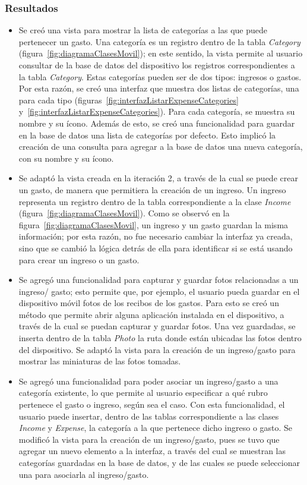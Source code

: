 \subsubsection{Resultados}
\begin{itemize}
\item Se creó una vista para mostrar la lista de categorías a las que puede pertenecer un gasto. Una categoría es un registro dentro de la tabla \textit{Category} (figura~\ref{fig:diagramaClasesMovil}); en este sentido, la vista permite al usuario consultar de la base de datos del dispositivo los registros correspondientes a la tabla \textit{Category}. Estas categorías pueden ser de dos tipos: ingresos o gastos. Por esta razón, se creó una interfaz que muestra dos listas de categorías, una para cada tipo (figuras~\ref{fig:interfazListarExpenseCategories} y~\ref{fig:interfazListarExpenseCategories}). Para cada categoría, se muestra su nombre y su ícono. Además de esto, se creó una funcionalidad para guardar en la base de datos una lista de categorías por defecto. Esto implicó la creación de una consulta para agregar a la base de datos una nueva categoría, con su nombre y su ícono.
\item Se adaptó la vista creada en la iteración 2, a través de la cual se puede crear un gasto, de manera que permitiera la creación de un ingreso. Un ingreso representa un registro dentro de la tabla correspondiente a la clase \textit{Income} (figura~\ref{fig:diagramaClasesMovil}). Como se observó en la figura~\ref{fig:diagramaClasesMovil}, un ingreso y un gasto guardan la misma información; por esta razón, no fue necesario cambiar la interfaz ya creada, sino que se cambió la lógica detrás de ella para identificar si se está usando para crear un ingreso o un gasto.
\item Se agregó una funcionalidad para capturar y guardar fotos relacionadas a un ingreso/ gasto; esto permite que, por ejemplo, el usuario pueda guardar en el dispositivo móvil fotos de los recibos de los gastos. Para esto se creó un método que permite abrir alguna aplicación instalada en el dispositivo, a través de la cual se puedan capturar y guardar fotos. Una vez guardadas, se inserta dentro de la tabla \textit{Photo} la ruta donde están ubicadas las fotos dentro del dispositivo. Se adaptó la vista para la creación de un ingreso/gasto para mostrar las miniaturas de las fotos tomadas.%
\item Se agregó una funcionalidad para poder asociar un ingreso/gasto a una categoría existente, lo que permite al usuario especificar a qué rubro pertenece el gasto o ingreso, según sea el caso. Con esta funcionalidad, el usuario puede insertar, dentro de las tablas correspondiente a las clases \textit{Income} y \textit{Expense}, la categoría a la que pertenece dicho ingreso o gasto. Se modificó la vista para la creación de un ingreso/gasto, pues se tuvo que agregar un nuevo elemento a la interfaz, a través del cual se muestran las categorías guardadas en la base de datos, y de las cuales se puede seleccionar una para asociarla al ingreso/gasto.


\end{itemize}
